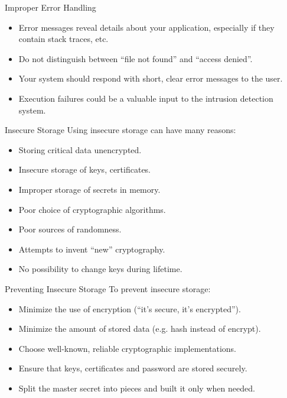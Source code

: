 \documentclass{beamer}
\begin{document}
\begin{printout}
\begin{slide}{Improper Error Handling}
  \begin{itemize}
    \item Error messages reveal details about your application, especially if they
          contain stack traces, etc.
    \item Do not distinguish between ``file not found'' and ``access denied''.
    \item Your system should respond with short, clear error messages to the user.
    \item Execution failures could be a valuable input to the intrusion detection system.
  \end{itemize}
\end{slide}
\end{printout}
\begin{slide}{Insecure Storage}
  Using insecure storage can have many reasons:
  \begin{itemize}
    \item Storing critical data unencrypted. 
    \item Insecure storage of keys, certificates.
    \item Improper storage of secrets in memory.
    \item Poor choice of cryptographic algorithms.
    \item Poor sources of randomness.
    \item Attempts to invent ``new'' cryptography.
    \item No possibility to change keys during lifetime.
  \end{itemize}
\end{slide}
\begin{slide}{Preventing Insecure Storage}
  To prevent insecure storage:
  \begin{itemize}
    \item Minimize the use of encryption (``it's secure, it's encrypted'').
    \item Minimize the amount of stored data (e.g. hash instead of encrypt).
  \end{itemize}
  \begin{itemize}
    \item Choose well-known, reliable cryptographic implementations.
    \item Ensure that keys, certificates and password are stored securely.
    \item Split the master secret into pieces and built it only when needed.
  \end{itemize}
\end{slide}
\end{document}
